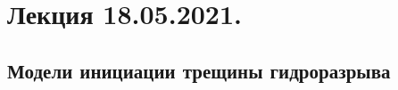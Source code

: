 \documentclass[main.tex]{subfiles}
\begin{document}

\section{Лекция 18.05.2021.}

\subsection{Модели инициации трещины гидроразрыва}
\end{document}
